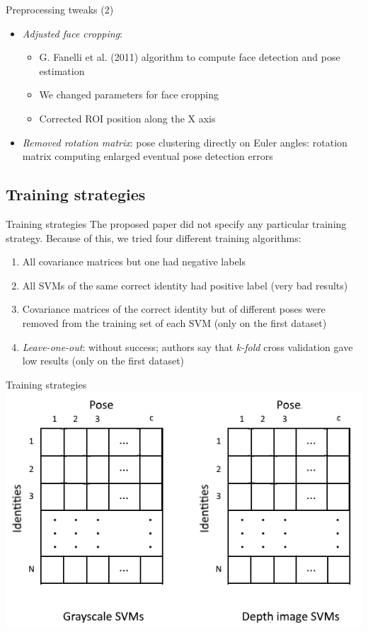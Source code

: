 \documentclass[unknownkeysallowed]{beamer}
\begin{document}
\begin{frame}{Preprocessing tweaks (2)}
	\begin{itemize}
		\item \textit{Adjusted face cropping}:
			\begin{itemize}
				\item G. Fanelli et al. (2011) algorithm to
					compute face detection and pose
					estimation
				\item We changed parameters for face cropping
				\item Corrected ROI position along the X
					axis
			\end{itemize}
		\item \textit{Removed rotation matrix}: pose clustering
			directly on Euler angles: rotation matrix computing
			enlarged eventual pose detection errors
	\end{itemize}
\end{frame}

\subsection{Training strategies}
\begin{frame}{Training strategies}
	The proposed paper did not specify any particular training strategy.
	Because of this, we tried four different training algorithms:
	\begin{enumerate}
		\item All covariance matrices but
			one had negative labels
		\item All SVMs of the same correct identity
			had positive label (very bad results)
		\item Covariance matrices of the correct identity but of
			different poses were removed from the training set of
			each SVM (only on the first dataset)
		\item \textit{Leave-one-out}: without
			success; authors say that \textit{k-fold} cross
			validation gave low results (only on the first dataset)
	\end{enumerate}
\end{frame}

\begin{frame}{Training strategies}
	\includegraphics[width=\linewidth]{svms}
\end{frame}
\end{document}
